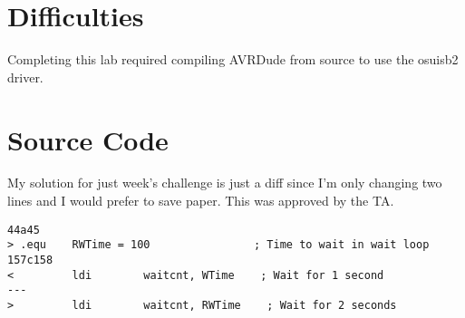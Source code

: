 \documentclass[12pt,letterpaper]{article}
\begin{document}
\section{Difficulties}
Completing this lab required compiling AVRDude from source to use the osuisb2
driver.

\section{Source Code}
My solution for just week's challenge is just a diff since I'm only changing
two lines and I would prefer to save paper. This was approved by the TA.
\begin{verbatim}
44a45
> .equ    RWTime = 100                ; Time to wait in wait loop
157c158
<         ldi        waitcnt, WTime    ; Wait for 1 second
---
>         ldi        waitcnt, RWTime    ; Wait for 2 seconds
\end{verbatim}
\end{document}
